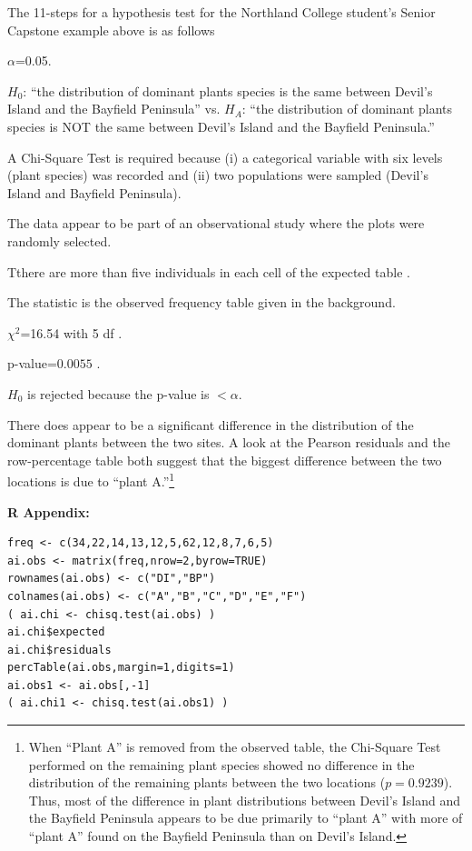 \documentclass[10pt,openany]{book}\usepackage[]{graphicx}\usepackage[]{color}
\makeatletter
\newenvironment{kframe}{%
 \def\at@end@of@kframe{}%
 \ifinner\ifhmode%
  \def\at@end@of@kframe{\end{minipage}}%
  \begin{minipage}{\columnwidth}%
 \fi\fi%
 \def\FrameCommand##1{\hskip\@totalleftmargin \hskip-\fboxsep
 \colorbox{shadecolor}{##1}\hskip-\fboxsep
     \hskip-\linewidth \hskip-\@totalleftmargin \hskip\columnwidth}%
 \MakeFramed {\advance\hsize-\width
   \@totalleftmargin\z@ \linewidth\hsize
   \@setminipage}}%
 {\par\unskip\endMakeFramed%
 \at@end@of@kframe}
\newenvironment{knitrout}{}{} %
\makeatother
\begin{document}
The 11-steps  for a hypothesis test for the Northland College student's Senior Capstone example above is as follows
  \begin{Enumerate}
    \item $\alpha$=0.05.
    \item $H_{0}$: ``the distribution of dominant plants species is the same between Devil's Island and the Bayfield Peninsula'' vs. $H_{A}$: ``the distribution of dominant plants species is NOT the same between Devil's Island and the Bayfield Peninsula.''
    \item A Chi-Square Test is required because (i) a categorical variable with six levels (plant species) was recorded and (ii) two populations were sampled (Devil's Island and Bayfield Peninsula).
    \item The data appear to be part of an observational study where the plots were randomly selected.
    \item Tthere are more than five individuals in each cell of the expected table .
    \item The statistic is the observed frequency table given in the background.
    \item $\chi^{2}$=16.54 with 5 df .
    \item p-value=$0.0055$ .
    \item $H_{0}$ is rejected because the p-value is $<\alpha$.
    \item There does appear to be a significant difference in the distribution of the dominant plants between the two sites.  A look at the Pearson residuals  and the row-percentage table  both suggest that the biggest difference between the two locations is due to ``plant A.''\footnote{When ``Plant A'' is removed from the observed table, the Chi-Square Test performed on the remaining plant species showed no difference in the distribution of the remaining plants between the two locations ($p=0.9239$).  Thus, most of the difference in plant distributions between Devil's Island and the Bayfield Peninsula appears to be due primarily to ``plant A'' with more of ``plant A'' found on the Bayfield Peninsula than on Devil's Island.}
  \end{Enumerate}

\begin{minipage}{\textwidth}
\textbf{R Appendix:}
\begin{knitrout}
\color{fgcolor}\begin{kframe}
\begin{verbatim}
freq <- c(34,22,14,13,12,5,62,12,8,7,6,5)
ai.obs <- matrix(freq,nrow=2,byrow=TRUE)
rownames(ai.obs) <- c("DI","BP")
colnames(ai.obs) <- c("A","B","C","D","E","F")
( ai.chi <- chisq.test(ai.obs) )
ai.chi$expected
ai.chi$residuals
percTable(ai.obs,margin=1,digits=1)
ai.obs1 <- ai.obs[,-1]
( ai.chi1 <- chisq.test(ai.obs1) )
\end{verbatim}
\end{kframe}
\end{knitrout}
\end{minipage}
\end{document}
